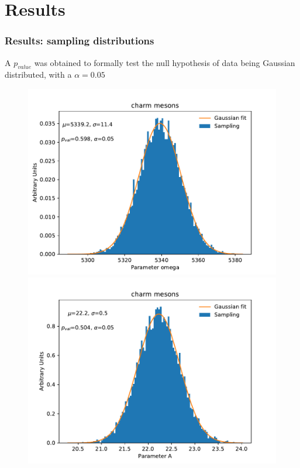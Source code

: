 \documentclass[10pt]{beamer}
\begin{document}
\section{Results}
\begin{frame}
\frametitle{Results: sampling distributions}
\scriptsize{A $p_{value}$ was obtained to formally test the null hypothesis of data being Gaussian distributed, with a $\alpha = 0.05$}
\begin{figure}
   \includegraphics[scale=0.325]{./Plots/charm_bootstrap_k_All.pdf}
   \includegraphics[scale=0.325]{./Plots/charm_bootstrap_a_All.pdf}       
\end{figure}

\end{frame}
\end{document}
